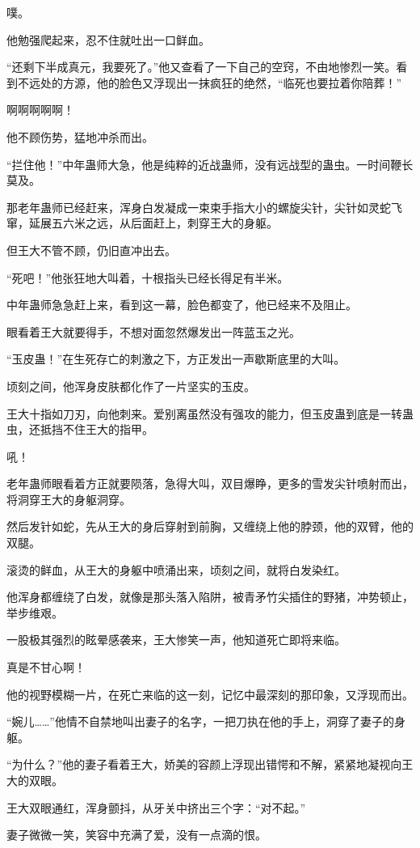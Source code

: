 \begin{this_body}
噗。

他勉强爬起来，忍不住就吐出一口鲜血。

“还剩下半成真元，我要死了。”他又查看了一下自己的空窍，不由地惨烈一笑。看到不远处的方源，他的脸色又浮现出一抹疯狂的绝然，“临死也要拉着你陪葬！”

啊啊啊啊啊！

他不顾伤势，猛地冲杀而出。

“拦住他！”中年蛊师大急，他是纯粹的近战蛊师，没有远战型的蛊虫。一时间鞭长莫及。

那老年蛊师已经赶来，浑身白发凝成一束束手指大小的螺旋尖针，尖针如灵蛇飞窜，延展五六米之远，从后面赶上，刺穿王大的身躯。

但王大不管不顾，仍旧直冲出去。

“死吧！”他张狂地大叫着，十根指头已经长得足有半米。

中年蛊师急急赶上来，看到这一幕，脸色都变了，他已经来不及阻止。

眼看着王大就要得手，不想对面忽然爆发出一阵蓝玉之光。

“玉皮蛊！”在生死存亡的刺激之下，方正发出一声歇斯底里的大叫。

顷刻之间，他浑身皮肤都化作了一片坚实的玉皮。

王大十指如刀刃，向他刺来。爱别离虽然没有强攻的能力，但玉皮蛊到底是一转蛊虫，还抵挡不住王大的指甲。

吼！

老年蛊师眼看着方正就要陨落，急得大叫，双目爆睁，更多的雪发尖针喷射而出，将洞穿王大的身躯洞穿。

然后发针如蛇，先从王大的身后穿射到前胸，又缠绕上他的脖颈，他的双臂，他的双腿。

滚烫的鲜血，从王大的身躯中喷涌出来，顷刻之间，就将白发染红。

他浑身都缠绕了白发，就像是那头落入陷阱，被青矛竹尖插住的野猪，冲势顿止，举步维艰。

一股极其强烈的眩晕感袭来，王大惨笑一声，他知道死亡即将来临。

真是不甘心啊！

他的视野模糊一片，在死亡来临的这一刻，记忆中最深刻的那印象，又浮现而出。

“婉儿……”他情不自禁地叫出妻子的名字，一把刀执在他的手上，洞穿了妻子的身躯。

“为什么？”他的妻子看着王大，娇美的容颜上浮现出错愕和不解，紧紧地凝视向王大的双眼。

王大双眼通红，浑身颤抖，从牙关中挤出三个字：“对不起。”

妻子微微一笑，笑容中充满了爱，没有一点滴的恨。


\end{this_body}
